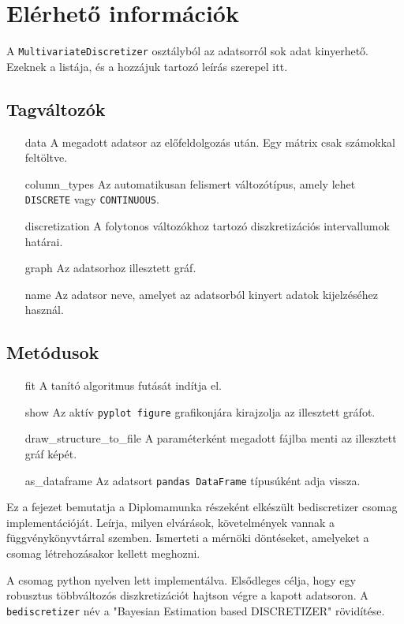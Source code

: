 \section{Elérhető információk}
A \verb|MultivariateDiscretizer| osztályból az adatsorról sok adat kinyerhető. Ezeknek a listája, és a hozzájuk tartozó leírás szerepel itt.

\subsection{Tagváltozók}
\begin{itemize}
    \item[data] A megadott adatsor az előfeldolgozás után. Egy mátrix csak számokkal feltöltve.
    \item[column\_types] Az automatikusan felismert változótípus, amely lehet \verb|DISCRETE| vagy \verb|CONTINUOUS|.
    \item[discretization] A folytonos változókhoz tartozó diszkretizációs intervallumok határai.
    \item[graph] Az adatsorhoz illesztett gráf.
    \item[name] Az adatsor neve, amelyet az adatsorból kinyert adatok kijelzéséhez használ.
\end{itemize}

\subsection{Metódusok}
\begin{itemize}
    \setlength{\itemindent}{5em}
    \item[fit] A tanító algoritmus futását indítja el.
    \item[show] Az aktív \verb|pyplot figure| grafikonjára kirajzolja az illesztett gráfot.
    \item[draw\_structure\_to\_file] A paraméterként megadott fájlba menti az illesztett gráf képét.
    \item[as\_dataframe] Az adatsort \verb|pandas DataFrame| típusúként adja vissza.
\end{itemize}
\fi

Ez a fejezet bemutatja a Diplomamunka részeként elkészült bediscretizer csomag implementációját. Leírja, milyen elvárások, követelmények vannak a függvénykönyvtárral szemben. Ismerteti a mérnöki döntéseket, amelyeket a csomag létrehozásakor kellett meghozni.

A csomag python nyelven lett implementálva. Elsődleges célja, hogy egy robusztus többváltozós diszkretizációt hajtson végre a kapott adatsoron. A \verb|bediscretizer| név a "Bayesian Estimation based DISCRETIZER" rövidítése.

